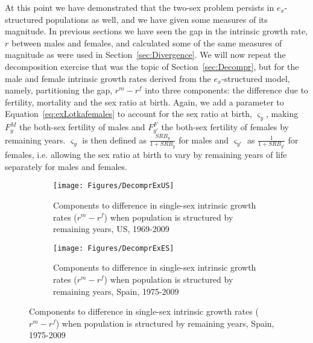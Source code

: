 At this point we have demonstrated that the two-sex problem persists in
$e_x$-structured populations as well, and we have given some measures of its
magnitude. In previous sections we have seen the gap in the intrinsic growth
rate, $r$ between males and females, and calculated some of the same 
measures of magnitude as were used in Section~\ref{sec:Divergence}. We
will now repeat the decomposition exercise that was the topic of 
Section~\ref{sec:Decompr}, but for the male and female intrinsic growth rates
derived from the $e_x$-structured model, namely, partitioning the gap, $r^m-r^f$
into three components: the difference due to fertility, mortality and the sex
ratio at birth. Again, we add a parameter to Equation~\eqref{eq:exLotkafemales}
to account for the sex ratio at birth, $\varsigma _{y}$, making $F_{y}^M$
the both-sex fertility of males and $F_{y'}^F$ the both-sex fertility of females
by remaining years. $\varsigma _{y}$ is then defined as $\frac{SRB_y}{1+SRB_y}$
for males and $\varsigma _{y'}$ as $\frac{1}{1+SRB_{y'}}$ for females, i.e.
allowing the sex ratio at birth to vary by remaining years of life separately for males and females.
\begin{figure}
        \centering
        \begin{subfigure}
                \centering
                \caption{Components to difference in single-sex intrinsic growth
                rates ($r^m - r^f$) when population is structured by remaining
                years, US, 1969-2009}
                \texttt{[image: Figures/DecomprExUS]}
                \label{fig:exDecomprUS}
        \end{subfigure}
        \begin{subfigure}
                \centering
                \caption{Components to difference in single-sex intrinsic growth
                rates ($r^m - r^f$) when population is structured by remaining
                years, Spain, 1975-2009}
                \texttt{[image: Figures/DecomprExES]}
               
                \label{fig:exDecomprES}
        \end{subfigure}
\end{figure}